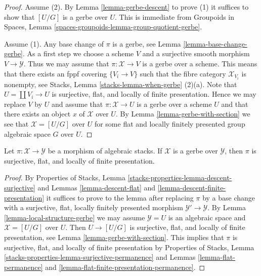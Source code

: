 \begin{proof}
Assume (2). By
Lemma \ref{lemma-gerbe-descent}
to prove (1) it suffices to show that $[U/G]$ is a gerbe over $U$.
This is immediate from
Groupoids in Spaces, Lemma \ref{spaces-groupoids-lemma-group-quotient-gerbe}.

\medskip\noindent
Assume (1). Any base change of $\pi$ is a gerbe, see
Lemma \ref{lemma-base-change-gerbe}.
As a first step we choose a scheme $V$ and a surjective smooth morphism
$V \to \mathcal{Y}$. Thus we may assume that $\pi : \mathcal{X} \to V$
is a gerbe over a scheme. This means that there exists an
fppf covering $\{V_i \to V\}$ such that the fibre category
$\mathcal{X}_{V_i}$ is nonempty, see
Stacks, Lemma \ref{stacks-lemma-when-gerbe} (2)(a).
Note that $U = \coprod V_i \to U$ is surjective, flat, and
locally of finite presentation. Hence we may replace $V$ by $U$ and
assume that $\pi : \mathcal{X} \to U$ is a gerbe over a scheme $U$ and
that there exists an object $x$ of $\mathcal{X}$ over $U$. By
Lemma \ref{lemma-gerbe-with-section}
we see that $\mathcal{X} = [U/G]$ over $U$ for some flat
and locally finitely presented group algebraic space $G$ over $U$.
\end{proof}

\begin{lemma}
\label{lemma-gerbe-fppf}
Let $\pi : \mathcal{X} \to \mathcal{Y}$ be a morphism of algebraic stacks.
If $\mathcal{X}$ is a gerbe over $\mathcal{Y}$, then $\pi$ is surjective,
flat, and locally of finite presentation.
\end{lemma}

\begin{proof}
By
Properties of Stacks, Lemma
\ref{stacks-properties-lemma-descent-surjective}
and
Lemmas \ref{lemma-descent-flat} and
\ref{lemma-descent-finite-presentation}
it suffices to prove to the lemma after replacing $\pi$ by a base change
with a surjective, flat, locally finitely presented morphism
$\mathcal{Y}' \to \mathcal{Y}$. By
Lemma \ref{lemma-local-structure-gerbe}
we may assume $\mathcal{Y} = U$ is an algebraic space and
$\mathcal{X} = [U/G]$ over $U$.
Then $U \to [U/G]$ is surjective, flat, and
locally of finite presentation, see
Lemma \ref{lemma-gerbe-with-section}.
This implies that $\pi$ is surjective, flat, and locally
of finite presentation by
Properties of Stacks,
Lemma \ref{stacks-properties-lemma-surjective-permanence}
and
Lemmas \ref{lemma-flat-permanence} and
\ref{lemma-flat-finite-presentation-permanence}.
\end{proof}

